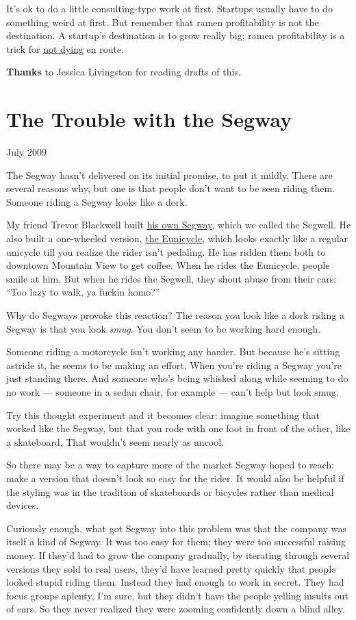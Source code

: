 \documentclass[12pt]{book}
\begin{document}
It's ok to do a little consulting-type work at first. Startups usually
have to do something weird at first. But remember that ramen
profitability is not the destination. A startup's destination is to grow
really big; ramen profitability is a trick for \href{die.html}{not
dying} en route.


\textbf{Thanks} to Jessica Livingston for reading drafts of this.
\chapter{The Trouble with the Segway}

July 2009

The Segway hasn't delivered on its initial promise, to put it mildly.
There are several reasons why, but one is that people don't want to be
seen riding them. Someone riding a Segway looks like a dork.

My friend Trevor Blackwell built \href{http://tlb.org/\#scooter}{his own
Segway}, which we called the Segwell. He also built a one-wheeled
version, \href{http://tlb.org/\#eunicycle}{the Eunicycle}, which looks
exactly like a regular unicycle till you realize the rider isn't
pedaling. He has ridden them both to downtown Mountain View to get
coffee. When he rides the Eunicycle, people smile at him. But when he
rides the Segwell, they shout abuse from their cars: ``Too lazy to walk,
ya fuckin homo?''

Why do Segways provoke this reaction? The reason you look like a dork
riding a Segway is that you look \emph{smug}. You don't seem to be
working hard enough.

Someone riding a motorcycle isn't working any harder. But because he's
sitting astride it, he seems to be making an effort. When you're riding
a Segway you're just standing there. And someone who's being whisked
along while seeming to do no work --- someone in a sedan chair, for
example --- can't help but look smug.

Try this thought experiment and it becomes clear: imagine something that
worked like the Segway, but that you rode with one foot in front of the
other, like a skateboard. That wouldn't seem nearly as uncool.

So there may be a way to capture more of the market Segway hoped to
reach: make a version that doesn't look so easy for the rider. It would
also be helpful if the styling was in the tradition of skateboards or
bicycles rather than medical devices.

Curiously enough, what got Segway into this problem was that the company
was itself a kind of Segway. It was too easy for them; they were too
successful raising money. If they'd had to grow the company gradually,
by iterating through several versions they sold to real users, they'd
have learned pretty quickly that people looked stupid riding them.
Instead they had enough to work in secret. They had focus groups
aplenty, I'm sure, but they didn't have the people yelling insults out
of cars. So they never realized they were zooming confidently down a
blind alley.
\end{document}
